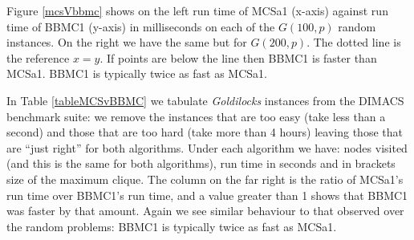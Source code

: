 \documentclass{l4proj}
\begin{document}
Figure \ref{mcsVbbmc} shows on the left run time of MCSa1 (x-axis) against run time of BBMC1 (y-axis) in milliseconds on each of the
$G(100,p)$ random instances. On the right we have the same but for $G(200,p)$. The dotted line is the reference $x = y$. If points
are below the line then BBMC1 is faster than MCSa1. BBMC1 is typically twice as fast as MCSa1.

In Table \ref{tableMCSvBBMC} we tabulate \emph{Goldilocks} instances from the DIMACS benchmark suite: we remove the instances that are too
easy (take less than a second) and those that are too hard (take more than 4 hours) leaving those that are ``just right''
for both algorithms.
Under each algorithm we have: nodes visited (and this is the same for both algorithms), run time in seconds and in brackets
size of the maximum clique. The column on the far right is the ratio of MCSa1's run time over BBMC1's run time, and a value greater
than 1 shows that BBMC1 was faster by that amount. Again we see similar behaviour to that observed over the random problems: 
BBMC1 is typically twice as fast as MCSa1.
\end{document}
